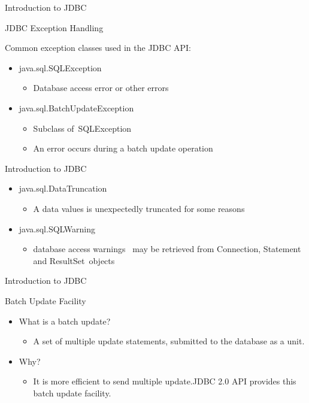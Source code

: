 \documentclass[14pt]{beamer}
\begin{document}
\begin{frame}[fragile]{Introduction to JDBC}
\begin{block}{}
JDBC Exception Handling
\end{block}
\begin{block}{}
Common exception classes used in the JDBC API:
\end{block}
\begin{itemize}
\item java.sql.SQLException
\begin{itemize}
\item Database access error or other errors
\end{itemize}
\item java.sql.BatchUpdateException
\begin{itemize}
\item Subclass of SQLException 
\item An error occurs during a batch update operation
\end{itemize}
\end{itemize}
\end{frame}

\begin{frame}[fragile]{Introduction to JDBC}
\begin{itemize}
\item java.sql.DataTruncation
\begin{itemize}
\item A data values is unexpectedly truncated for some reasons 
\end{itemize}
\item java.sql.SQLWarning
\begin{itemize}
\item database access warnings  may be retrieved from Connection, Statement and ResultSet objects 
\end{itemize}
\end{itemize}
\end{frame}

\begin{frame}[fragile]{Introduction to JDBC}
\begin{block}{}
Batch Update Facility
\end{block}
\begin{itemize}
\item What is a batch update? 
\begin{itemize}
\item A set of multiple update statements, submitted to the database as a unit.
\end{itemize}
\item Why?
\begin{itemize}
\item It is more efficient to send multiple update.JDBC 2.0 API provides this batch update facility. 
\end{itemize}
\end{itemize}
\end{frame}
\end{document}
